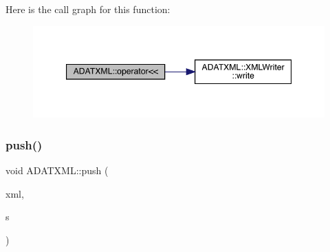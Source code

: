 Here is the call graph for this function\+:\nopagebreak
\begin{figure}[H]
\begin{center}
\leavevmode
\includegraphics[width=347pt]{d7/da0/namespaceADATXML_a5588aaaf70ed009fbd91977db5399dd1_cgraph}
\end{center}
\end{figure}
\mbox{\label{namespaceADATXML_a1e8531ea0cb1a302d918f3b427969425}} 
\subsubsection{\texorpdfstring{push()}{push()}}
{\footnotesize\ttfamily void A\+D\+A\+T\+X\+M\+L\+::push (\begin{DoxyParamCaption}\item[{\mbox{\hyperlink{classADATXML_1_1XMLWriter}{X\+M\+L\+Writer}} \&}]{xml,  }\item[{const string \&}]{s }\end{DoxyParamCaption})}

